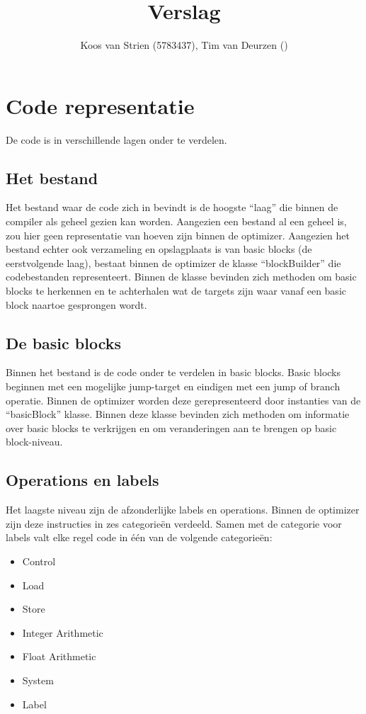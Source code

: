 \documentclass[a4paper,10pt]{article}
\author{Koos van Strien (5783437), Tim van Deurzen ()}
\title{Verslag}
\begin{document}
\maketitle

\section{Code representatie}
De code is in verschillende lagen onder te verdelen.

\subsection{Het bestand}
Het bestand waar de code zich in bevindt is de hoogste ``laag'' die binnen de
compiler als geheel gezien kan worden.  Aangezien een bestand al een geheel is,
zou hier geen representatie van hoeven zijn binnen de optimizer. Aangezien het
bestand echter ook verzameling en opslagplaats is van basic blocks (de
eerstvolgende laag), bestaat binnen de optimizer de klasse ``blockBuilder'' die
codebestanden representeert. Binnen de klasse bevinden zich methoden om basic
blocks te herkennen en te achterhalen wat de targets zijn waar vanaf een basic
block naartoe gesprongen wordt.


\subsection{De basic blocks}
Binnen het bestand is de code onder te verdelen in basic blocks. Basic blocks
beginnen met een mogelijke jump-target en eindigen met een jump of branch
operatie. Binnen de optimizer worden deze gerepresenteerd door instanties 
van de ``basicBlock'' klasse. Binnen deze klasse bevinden zich methoden om
informatie over basic blocks te verkrijgen en om veranderingen aan te brengen
op basic block-niveau.

\subsection{Operations en labels}
Het laagste niveau zijn de afzonderlijke labels en operations. Binnen de
optimizer zijn deze instructies in zes categorie\"en verdeeld. Samen met de
categorie voor labels valt elke regel code in \'e\'en van de volgende
categorie\"en:
\begin{itemize}
\item Control
\item Load
\item Store
\item Integer Arithmetic
\item Float Arithmetic
\item System
\item Label
\end{itemize}
\end{document}
